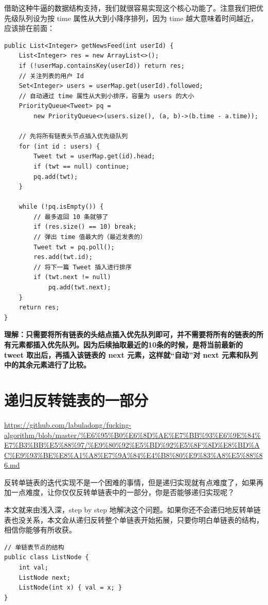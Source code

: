 \documentclass[12pt]{article}
\begin{document}
借助这种牛逼的数据结构支持，我们就很容易实现这个核心功能了。注意我们把优先级队列设为按 time 属性从大到小降序排列，因为 time 越大意味着时间越近，应该排在前面：
\begin{lstlisting}
public List<Integer> getNewsFeed(int userId) {
    List<Integer> res = new ArrayList<>();
    if (!userMap.containsKey(userId)) return res;
    // 关注列表的用户 Id
    Set<Integer> users = userMap.get(userId).followed;
    // 自动通过 time 属性从大到小排序，容量为 users 的大小
    PriorityQueue<Tweet> pq = 
        new PriorityQueue<>(users.size(), (a, b)->(b.time - a.time));

    // 先将所有链表头节点插入优先级队列
    for (int id : users) {
        Tweet twt = userMap.get(id).head;
        if (twt == null) continue;
        pq.add(twt);
    }

    while (!pq.isEmpty()) {
        // 最多返回 10 条就够了
        if (res.size() == 10) break;
        // 弹出 time 值最大的（最近发表的）
        Tweet twt = pq.poll();
        res.add(twt.id);
        // 将下一篇 Tweet 插入进行排序
        if (twt.next != null) 
            pq.add(twt.next);
    }
    return res;
}
\end{lstlisting}

\begin{framed}
\textbf{理解：只需要将所有链表的头结点插入优先队列即可，并不需要将所有的链表的所有元素都插入优先队列。因为后续抽取最近的10条的时候，是将当前最新的 tweet 取出后，再插入该链表的 next 元素，这样就“自动”对 next 元素和队列中的其余元素进行了比较。
}
\end{framed}

\section{递归反转链表的一部分}
\url{https://github.com/labuladong/fucking-algorithm/blob/master/%E6%95%B0%E6%8D%AE%E7%BB%93%E6%9E%84%E7%B3%BB%E5%88%97/%E9%80%92%E5%BD%92%E5%8F%8D%E8%BD%AC%E9%93%BE%E8%A1%A8%E7%9A%84%E4%B8%80%E9%83%A8%E5%88%86.md}

反转单链表的迭代实现不是一个困难的事情，但是递归实现就有点难度了，如果再加一点难度，让你仅仅反转单链表中的一部分，你是否能够递归实现呢？

本文就来由浅入深，step by step 地解决这个问题。如果你还不会递归地反转单链表也没关系，本文会从递归反转整个单链表开始拓展，只要你明白单链表的结构，相信你能够有所收获。
\begin{lstlisting}
// 单链表节点的结构
public class ListNode {
    int val;
    ListNode next;
    ListNode(int x) { val = x; }
}
\end{lstlisting}
\end{document}
